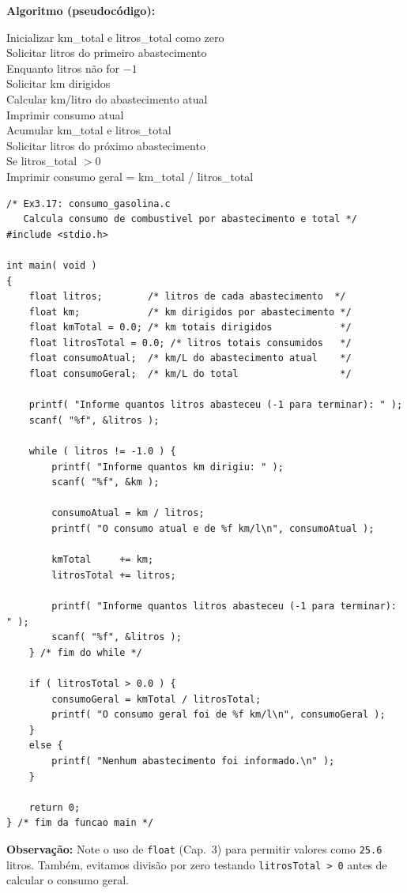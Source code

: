 \documentclass[12pt,a4paper]{article}
\begin{document}
\begin{respostabox}
\textbf{Algoritmo (pseudocódigo):}
\begin{pseudo}
Inicializar km\_total e litros\_total como zero\\
Solicitar litros do primeiro abastecimento\\
Enquanto litros não for $-1$\\
\hphantom{En}Solicitar km dirigidos\\
\hphantom{En}Calcular km/litro do abastecimento atual\\
\hphantom{En}Imprimir consumo atual\\
\hphantom{En}Acumular km\_total e litros\_total\\
\hphantom{En}Solicitar litros do próximo abastecimento\\
Se litros\_total $> 0$\\
\hphantom{En}Imprimir consumo geral = km\_total / litros\_total
\end{pseudo}

\begin{lstlisting}
/* Ex3.17: consumo_gasolina.c
   Calcula consumo de combustivel por abastecimento e total */
#include <stdio.h>

int main( void )
{
    float litros;        /* litros de cada abastecimento  */
    float km;            /* km dirigidos por abastecimento */
    float kmTotal = 0.0; /* km totais dirigidos            */
    float litrosTotal = 0.0; /* litros totais consumidos   */
    float consumoAtual;  /* km/L do abastecimento atual    */
    float consumoGeral;  /* km/L do total                  */

    printf( "Informe quantos litros abasteceu (-1 para terminar): " );
    scanf( "%f", &litros );

    while ( litros != -1.0 ) {
        printf( "Informe quantos km dirigiu: " );
        scanf( "%f", &km );

        consumoAtual = km / litros;
        printf( "O consumo atual e de %f km/l\n", consumoAtual );

        kmTotal     += km;
        litrosTotal += litros;

        printf( "Informe quantos litros abasteceu (-1 para terminar): " );
        scanf( "%f", &litros );
    } /* fim do while */

    if ( litrosTotal > 0.0 ) {
        consumoGeral = kmTotal / litrosTotal;
        printf( "O consumo geral foi de %f km/l\n", consumoGeral );
    }
    else {
        printf( "Nenhum abastecimento foi informado.\n" );
    }

    return 0;
} /* fim da funcao main */
\end{lstlisting}

\textbf{Observação:} Note o uso de \texttt{float} (Cap.~3) para permitir valores como
\texttt{25.6} litros. Também, evitamos divisão por zero testando \texttt{litrosTotal > 0}
antes de calcular o consumo geral.
\end{respostabox}
\end{document}

